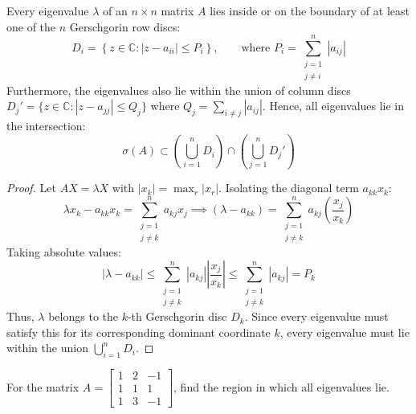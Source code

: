 \documentclass[11pt,a4paper]{article}
\begin{document}
\begin{theorembox}
Every eigenvalue $\lambda$ of an $n \times n$ matrix $A$ lies inside or on the boundary of at least one of the $n$ Gerschgorin row discs:
\begin{equation}
    D_i = \left\{ z \in \mathbb{C} : |z - a_{ii}| \le P_i \right\}, \qquad \text{where } P_i = \sum_{\substack{j=1 \\ j \ne i}}^n |a_{ij}|
\end{equation}
Furthermore, the eigenvalues also lie within the union of column discs $D_j' = \{z \in \mathbb{C} : |z - a_{jj}| \le Q_j\}$ where $Q_j = \sum_{i \ne j} |a_{ij}|$. Hence, all eigenvalues lie in the intersection:
\begin{equation}
    \sigma(A) \subset \left( \bigcup_{i=1}^n D_i \right) \cap \left( \bigcup_{j=1}^n D_j' \right)
\end{equation}
\end{theorembox}

\begin{proof}
Let $AX = \lambda X$ with $|x_k| = \max_r |x_r|$. Isolating the diagonal term $a_{kk} x_k$:
$$\lambda x_k - a_{kk} x_k = \sum_{\substack{j=1 \\ j \ne k}}^n a_{kj} x_j \implies (\lambda - a_{kk}) = \sum_{\substack{j=1 \\ j \ne k}}^n a_{kj} \left(\frac{x_j}{x_k}\right)$$
Taking absolute values:
$$|\lambda - a_{kk}| \le \sum_{\substack{j=1 \\ j \ne k}}^n |a_{kj}| \left|\frac{x_j}{x_k}\right| \le \sum_{\substack{j=1 \\ j \ne k}}^n |a_{kj}| = P_k$$
Thus, $\lambda$ belongs to the $k$-th Gerschgorin disc $D_k$. Since every eigenvalue must satisfy this for its corresponding dominant coordinate $k$, every eigenvalue must lie within the union $\bigcup_{i=1}^n D_i$.
\end{proof}

\begin{exambox}
For the matrix $A = \begin{bmatrix} 1 & 2 & -1 \\ 1 & 1 & 1 \\ 1 & 3 & -1 \end{bmatrix}$, find the region in which all eigenvalues lie.
\end{exambox}
\end{document}
